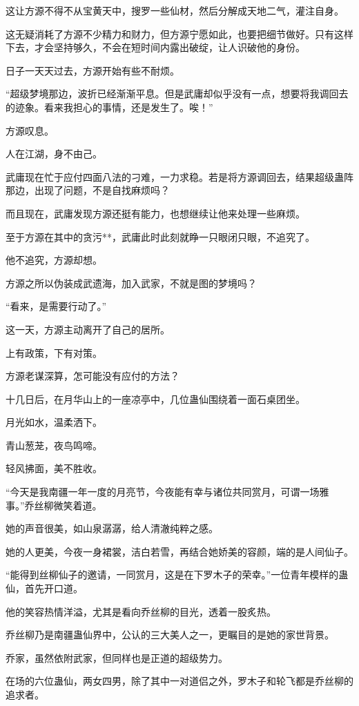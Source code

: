 \begin{this_body}
这让方源不得不从宝黄天中，搜罗一些仙材，然后分解成天地二气，灌注自身。

这无疑消耗了方源不少精力和财力，但方源宁愿如此，也要把细节做好。只有这样下去，才会坚持够久，不会在短时间内露出破绽，让人识破他的身份。

日子一天天过去，方源开始有些不耐烦。

“超级梦境那边，波折已经渐渐平息。但是武庸却似乎没有一点，想要将我调回去的迹象。看来我担心的事情，还是发生了。唉！”

方源叹息。

人在江湖，身不由己。

武庸现在忙于应付四面八法的刁难，一力求稳。若是将方源调回去，结果超级蛊阵那边，出现了问题，不是自找麻烦吗？

而且现在，武庸发现方源还挺有能力，也想继续让他来处理一些麻烦。

至于方源在其中的贪污**，武庸此时此刻就睁一只眼闭只眼，不追究了。

他不追究，方源却想。

方源之所以伪装成武遗海，加入武家，不就是图的梦境吗？

“看来，是需要行动了。”

这一天，方源主动离开了自己的居所。

上有政策，下有对策。

方源老谋深算，怎可能没有应付的方法？

十几日后，在月华山上的一座凉亭中，几位蛊仙围绕着一面石桌团坐。

月光如水，温柔洒下。

青山葱茏，夜鸟鸣啼。

轻风拂面，美不胜收。

“今天是我南疆一年一度的月亮节，今夜能有幸与诸位共同赏月，可谓一场雅事。”乔丝柳微笑着道。

她的声音很美，如山泉潺潺，给人清澈纯粹之感。

她的人更美，今夜一身裙裳，洁白若雪，再结合她娇美的容颜，端的是人间仙子。

“能得到丝柳仙子的邀请，一同赏月，这是在下罗木子的荣幸。”一位青年模样的蛊仙，首先开口道。

他的笑容热情洋溢，尤其是看向乔丝柳的目光，透着一股炙热。

乔丝柳乃是南疆蛊仙界中，公认的三大美人之一，更瞩目的是她的家世背景。

乔家，虽然依附武家，但同样也是正道的超级势力。

在场的六位蛊仙，两女四男，除了其中一对道侣之外，罗木子和轮飞都是乔丝柳的追求者。


\end{this_body}
